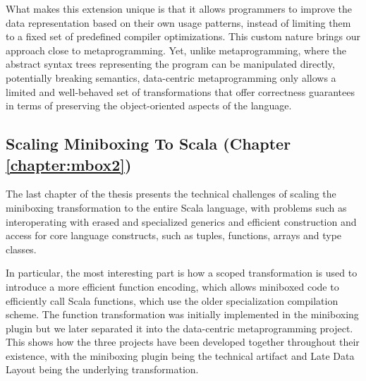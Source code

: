 What makes this extension unique is that it allows programmers to improve the data representation based on their own usage patterns, instead of limiting them to a fixed set of predefined compiler optimizations. This custom nature brings our approach close to metaprogramming. Yet, unlike metaprogramming, where the abstract syntax trees representing the program can be manipulated directly, potentially breaking semantics, data-centric metaprogramming only allows a limited and well-behaved set of transformations that offer correctness guarantees in terms of preserving the object-oriented aspects of the language.

%
%

\subsection{Scaling Miniboxing To Scala (Chapter \ref{chapter:mbox2})}

The last chapter of the thesis presents the technical challenges of scaling the miniboxing transformation to the entire Scala language, with problems such as interoperating with erased and specialized generics and efficient construction and access for core language constructs, such as tuples, functions, arrays and type classes.

In particular, the most interesting part is how a scoped transformation is used to introduce a more efficient function encoding, which allows miniboxed code to efficiently call Scala functions, which use the older specialization compilation scheme. The function transformation was initially implemented in the miniboxing plugin but we later separated it into the data-centric metaprogramming project. This shows how the three projects have been developed together throughout their existence, with the miniboxing plugin being the technical artifact and Late Data Layout being the underlying transformation.


